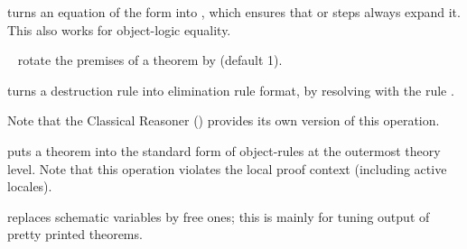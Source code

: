 \begin{isabellebody}
\begin{isamarkuptext}
\begin{description}
  \item \hyperlink{attribute.abs-def}{\mbox{}} turns an equation of the form  into , which ensures that \hyperlink{method.simp}{\mbox{}} or \hyperlink{method.unfold}{\mbox{}} steps always expand it.  This also works
  for object-logic equality.

  \item \hyperlink{attribute.rotated}{\mbox{}}~ rotate the premises of a
  theorem by  (default 1).

  \item \hyperlink{attribute.Pure.elim-format}{\mbox{}} turns a destruction rule into
  elimination rule format, by resolving with the rule .
  
  Note that the Classical Reasoner () provides
  its own version of this operation.

  \item \hyperlink{attribute.standard}{\mbox{}} puts a theorem into the standard form of
  object-rules at the outermost theory level.  Note that this
  operation violates the local proof context (including active
  locales).

  \item \hyperlink{attribute.no-vars}{\mbox{}} replaces schematic variables by free
  ones; this is mainly for tuning output of pretty printed theorems.


\end{description}
\end{isamarkuptext}
\end{isabellebody}
